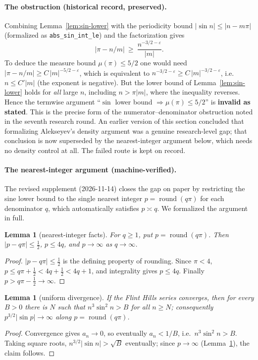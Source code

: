 \documentclass[11pt]{amsart}
\newtheorem{lemma}[theorem]{Lemma}
\theoremstyle{definition}
\theoremstyle{remark}
\numberwithin{equation}{section}
\newcommand{\irr}{\mu}
\begin{document}
\paragraph{The obstruction (historical record, preserved).} Combining Lemma~\ref{lem:sin-lower} with the periodicity bound $|\sin n|\le|n-m\pi|$ (formalized as \texttt{abs\_\allowbreak{}sin\_\allowbreak{}int\_\allowbreak{}le}) and the factorization gives
\[
|\pi-n/m|\ \ge\ \frac{n^{-3/2-\varepsilon}}{|m|}.
\]
To deduce the measure bound $\irr(\pi)\le5/2$ one would need $|\pi-n/m|\ge C\,|m|^{-5/2-\varepsilon}$, which is equivalent to $n^{-3/2-\varepsilon}\ge C\,|m|^{-3/2-\varepsilon}$, i.e.\ $n\le C'|m|$ (the exponent is negative). But the lower bound of Lemma~\ref{lem:sin-lower} holds for \emph{all} large $n$, including $n>\pi|m|$, where the inequality reverses. Hence the termwise argument ``$\sin$ lower bound $\Rightarrow\irr(\pi)\le5/2$'' is \textbf{invalid as stated}. This is the precise form of the numerator--denominator obstruction noted in the seventh research round. An earlier version of this section concluded that formalizing Alekseyev's density argument was a genuine research-level gap; that conclusion is now superseded by the nearest-integer argument below, which needs no density control at all. The failed route is kept on record.

\paragraph{The nearest-integer argument (machine-verified).} The revised supplement (2026-11-14) closes the gap on paper by restricting the sine lower bound to the single nearest integer $p=\operatorname{round}(q\pi)$ for each denominator $q$, which automatically satisfies $p\asymp q$. We formalized the argument in full.

\begin{lemma}[nearest-integer facts]\label{lem:nearest} For $q\ge1$, put $p=\operatorname{round}(q\pi)$. Then $|p-q\pi|\le\tfrac12$, $p\le4q$, and $p\to\infty$ as $q\to\infty$.
\end{lemma}
\begin{proof} $|p-q\pi|\le\tfrac12$ is the defining property of rounding. Since $\pi<4$, $p\le q\pi+\tfrac12<4q+\tfrac12<4q+1$, and integrality gives $p\le4q$. Finally $p>q\pi-\tfrac12\to\infty$.
\end{proof}

\begin{lemma}[uniform divergence]\label{lem:uniform} If the Flint Hills series converges, then for every $B>0$ there is $N$ such that $n^3\sin^2n>B$ for all $n\ge N$; consequently $p^{3/2}|\sin p|\to\infty$ along $p=\operatorname{round}(q\pi)$.
\end{lemma}
\begin{proof} Convergence gives $a_n\to0$, so eventually $a_n<1/B$, i.e.\ $n^3\sin^2n>B$. Taking square roots, $n^{3/2}|\sin n|>\sqrt B$ eventually; since $p\to\infty$ (Lemma~\ref{lem:nearest}), the claim follows.
\end{proof}
\end{document}
